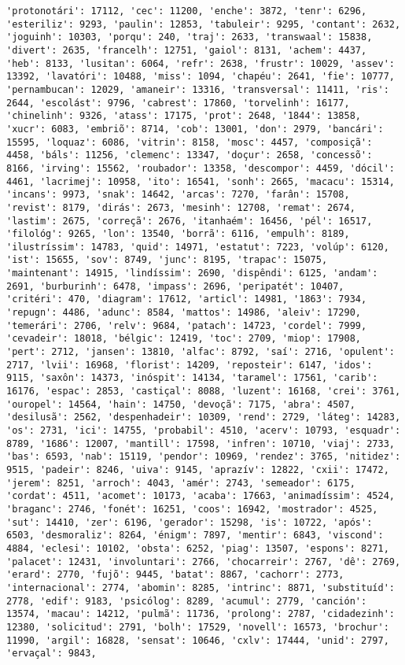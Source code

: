 \begin{Verbatim}[commandchars=\\\{\}]
'protonotári': 17112, 'cec': 11200, 'enche': 3872, 'tenr': 6296, 'esteriliz': 9293, 'paulin': 12853, 'tabuleir': 9295, 'contant': 2632, 'joguinh': 10303, 'porqu': 240, 'traj': 2633, 'transwaal': 15838, 'divert': 2635, 'francelh': 12751, 'gaiol': 8131, 'achem': 4437, 'heb': 8133, 'lusitan': 6064, 'refr': 2638, 'frustr': 10029, 'assev': 13392, 'lavatóri': 10488, 'miss': 1094, 'chapéu': 2641, 'fie': 10777, 'pernambucan': 12029, 'amaneir': 13316, 'transversal': 11411, 'ris': 2644, 'escolást': 9796, 'cabrest': 17860, 'torvelinh': 16177, 'chinelinh': 9326, 'atass': 17175, 'prot': 2648, '1844': 13858, 'xucr': 6083, 'embriõ': 8714, 'cob': 13001, 'don': 2979, 'bancári': 15595, 'loquaz': 6086, 'vitrin': 8158, 'mosc': 4457, 'composiçã': 4458, 'báls': 11256, 'clemenc': 13347, 'doçur': 2658, 'concessõ': 8166, 'irving': 15562, 'roubador': 13358, 'descompor': 4459, 'dócil': 4461, 'lacrimej': 10958, 'ito': 16541, 'sonh': 2665, 'macacu': 15314, 'incans': 9973, 'snak': 14642, 'arcas': 7270, 'farân': 15708, 'revist': 8179, 'dirás': 2673, 'mesinh': 12708, 'remat': 2674, 'lastim': 2675, 'correçã': 2676, 'itanhaém': 16456, 'pél': 16517, 'filológ': 9265, 'lon': 13540, 'borrã': 6116, 'empulh': 8189, 'ilustríssim': 14783, 'quid': 14971, 'estatut': 7223, 'volúp': 6120, 'ist': 15655, 'sov': 8749, 'junc': 8195, 'trapac': 15075, 'maintenant': 14915, 'lindíssim': 2690, 'dispêndi': 6125, 'andam': 2691, 'burburinh': 6478, 'impass': 2696, 'peripatét': 10407, 'critéri': 470, 'diagram': 17612, 'articl': 14981, '1863': 7934, 'repugn': 4486, 'adunc': 8584, 'mattos': 14986, 'aleiv': 17290, 'temerári': 2706, 'relv': 9684, 'patach': 14723, 'cordel': 7999, 'cevadeir': 18018, 'bélgic': 12419, 'toc': 2709, 'miop': 17908, 'pert': 2712, 'jansen': 13810, 'alfac': 8792, 'saí': 2716, 'opulent': 2717, 'lvii': 16968, 'florist': 14209, 'reposteir': 6147, 'idos': 9115, 'saxôn': 14373, 'inóspit': 14134, 'taramel': 17561, 'carib': 16176, 'espac': 2853, 'castiçal': 8088, 'luzent': 16168, 'crei': 3761, 'ouropel': 14564, 'hain': 14750, 'devoçã': 7175, 'abra': 4507, 'desilusã': 2562, 'despenhadeir': 10309, 'rend': 2729, 'láteg': 14283, 'os': 2731, 'ici': 14755, 'probabil': 4510, 'acerv': 10793, 'esquadr': 8789, '1686': 12007, 'mantill': 17598, 'infren': 10710, 'viaj': 2733, 'bas': 6593, 'nab': 15119, 'pendor': 10969, 'rendez': 3765, 'nitidez': 9515, 'padeir': 8246, 'uiva': 9145, 'aprazív': 12822, 'cxii': 17472, 'jerem': 8251, 'arroch': 4043, 'amér': 2743, 'semeador': 6175, 'cordat': 4511, 'acomet': 10173, 'acaba': 17663, 'animadíssim': 4524, 'braganc': 2746, 'fonét': 16251, 'coos': 16942, 'mostrador': 4525, 'sut': 14410, 'zer': 6196, 'gerador': 15298, 'is': 10722, 'após': 6503, 'desmoraliz': 8264, 'énigm': 7897, 'mentir': 6843, 'viscond': 4884, 'eclesi': 10102, 'obsta': 6252, 'piag': 13507, 'espons': 8271, 'palacet': 12431, 'involuntari': 2766, 'chocarreir': 2767, 'dê': 2769, 'erard': 2770, 'fujõ': 9445, 'batat': 8867, 'cachorr': 2773, 'internacional': 2774, 'abomin': 8285, 'intrinc': 8871, 'substituíd': 2778, 'edif': 9183, 'psicólog': 8289, 'acumul': 2779, 'canción': 13574, 'macau': 14212, 'pulmã': 11736, 'prolong': 2787, 'cidadezinh': 12380, 'solicitud': 2791, 'bolh': 17529, 'novell': 16573, 'brochur': 11990, 'argil': 16828, 'sensat': 10646, 'cxlv': 17444, 'unid': 2797, 'ervaçal': 9843, 
\end{Verbatim}
